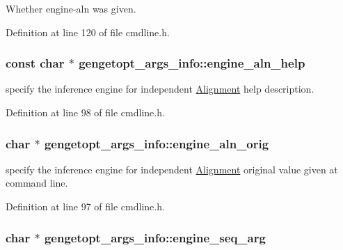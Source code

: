 Whether engine-\/aln was given. 



Definition at line 120 of file cmdline.\+h.

\hypertarget{structgengetopt__args__info_ac82fc1aba0c9785c9484b68abe875fba}{
\subsubsection[{engine\+\_\+aln\+\_\+help}]{\setlength{\rightskip}{0pt plus 5cm}const char $\ast$ gengetopt\+\_\+args\+\_\+info\+::engine\+\_\+aln\+\_\+help}}\label{structgengetopt__args__info_ac82fc1aba0c9785c9484b68abe875fba}


specify the inference engine for independent \hyperlink{class_alignment}{Alignment} help description. 



Definition at line 98 of file cmdline.\+h.

\hypertarget{structgengetopt__args__info_aefc2d0fce93eea31fcad7240368fc488}{
\subsubsection[{engine\+\_\+aln\+\_\+orig}]{\setlength{\rightskip}{0pt plus 5cm}char $\ast$ gengetopt\+\_\+args\+\_\+info\+::engine\+\_\+aln\+\_\+orig}}\label{structgengetopt__args__info_aefc2d0fce93eea31fcad7240368fc488}


specify the inference engine for independent \hyperlink{class_alignment}{Alignment} original value given at command line. 



Definition at line 97 of file cmdline.\+h.

\hypertarget{structgengetopt__args__info_a1a3510547af7d7dd9e238d147fb3bbf7}{
\subsubsection[{engine\+\_\+seq\+\_\+arg}]{\setlength{\rightskip}{0pt plus 5cm}char $\ast$ gengetopt\+\_\+args\+\_\+info\+::engine\+\_\+seq\+\_\+arg}}\label{structgengetopt__args__info_a1a3510547af7d7dd9e238d147fb3bbf7}


